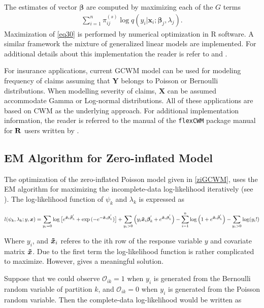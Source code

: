 \documentclass[11pt,letterpaper]{article}
\numberwithin{equation}{section}
\numberwithin{equation}{section}
\numberwithin{equation}{section}
\begin{document}
The estimates of vector $\bm\beta$ are computed by maximizing each of the $G$ terms
\begin{align}
\sum_{i=1}^{n}\pi^{(s)}_{ij} \log{q}(y_i|\bm x_i;\bm \beta_j,\lambda_j).
\label{eq30}
\end{align}
Maximization of \eqref{eq30} is performed by numerical optimization in R software. A similar framework the mixture of generalized linear models are implemented. For additional details about this implementation the reader is refer to \cite{Wedel+DeSabro:1995} and \cite{Wedel:2002}.

For insurance applications, current GCWM model can be used for modeling frequency of claims assuming that $\bm{Y}$ belongs to Poisson or Bernoulli distributions. When modelling severity of claims, $\bm{X}$ can be assumed accommodate Gamma or Log-normal distributions. All of these applications are based on CWM as the underlying approach. For additional implementation information, the reader is referred to the manual of the {\tt flexCWM} package manual for ${\bf R}$ users written by \cite{Ingrassia+Punzo+Vittadini+Minotti:2015}.%
\subsection{EM Algorithm for Zero-inflated Model} 
The optimization of the zero-inflated Poisson model given in \eqref{ziGCWM}, uses the EM algorithm for maximizing the incomplete-data log-likelihood iteratively (see \cite{Lambert}). The log-likelihood function of $\psi_k$ and $\lambda_k$ is expressed as

\begin{align*}
l(\psi_k,\lambda_k; y, \bm{x}) = \sum_{y_i = 0} \log \big[ e^{ \bm{ \bm{\tilde{x}}}_i \bm{\bar{\beta}}_k^{'}  } + \exp{( - e^ { -\bm{\bm{\tilde{x}}}_i \bm{\beta}_k^{'} })} \big] + \sum_{y_i > 0 } \left( y_i \bm{\tilde{x}}_i \bm{\beta}_k^{'} + e^{ \bm{\tilde{x}}_i \bm{\beta}_k^{'} } \right) - \sum_{i=1}^n  \log \left(1 + e^ {\bm{\tilde{x}}_i \bm{\bar{\beta}}_k^{'} } \right) - \sum_{y_i > 0} \log(y_i ! )
\end{align*}

Where $y_i$, and $\bm{\tilde{x}}_i$ referes to the ith row of the response variable $y$ and covariate matrix $\bm{\tilde{x}}$. Due to the first term the log-likelihood function is rather complicated to maximize. However, \cite{Lambert} gives a meaningful solution. 

Suppose that we could observe ${\mathcal{O}_{ik}} = 1$ when $y_i$ is generated from the Bernoulli random variable of partition $k$, and $\mathcal{O}_{ik} = 0$ when $y_i$ is generated from the Poisson random variable. Then the complete-data log-likelihood would be written as
\end{document}

